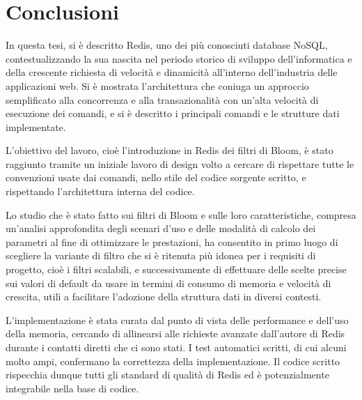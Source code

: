\chapter{Conclusioni}

In questa tesi, si è descritto Redis, uno dei più conosciuti database NoSQL, contestualizzando la
sua nascita nel periodo storico di sviluppo dell'informatica e della crescente richiesta di velocità
e dinamicità all'interno dell'industria delle applicazioni web. Si è mostrata l'architettura che
coniuga un approccio semplificato alla concorrenza e alla transazionalità con un'alta velocità di
esecuzione dei comandi, e si è descritto i principali comandi e le strutture dati implementate.

L'obiettivo del lavoro, cioè l'introduzione in Redis dei filtri di Bloom, è stato raggiunto tramite
un iniziale lavoro di design volto a cercare di rispettare tutte le convenzioni usate dai comandi,
nello stile del codice sorgente scritto, e rispettando l'architettura interna del codice.

Lo studio che è stato fatto sui filtri di Bloom e sulle loro caratteristiche, compresa un'analisi
approfondita degli scenari d'uso e delle modalità di calcolo dei parametri al fine di ottimizzare le
prestazioni, ha consentito in primo luogo di scegliere la variante di filtro che si è ritenuta più
idonea per i requisiti di progetto, cioè i filtri scalabili, e successivamente di effettuare delle
scelte precise sui valori di default da usare in termini di consumo di memoria e velocità di
crescita, utili a facilitare l'adozione della struttura dati in diversi contesti.

L'implementazione è stata curata dal punto di vista delle performance e dell'uso della memoria,
cercando di allinearsi alle richieste avanzate dall'autore di Redis durante i contatti diretti che
ci sono stati. I test automatici scritti, di cui alcuni molto ampi, confermano la correttezza della
implementazione. Il codice scritto rispecchia dunque tutti gli standard di qualità di Redis ed è
potenzialmente integrabile nella base di codice.
